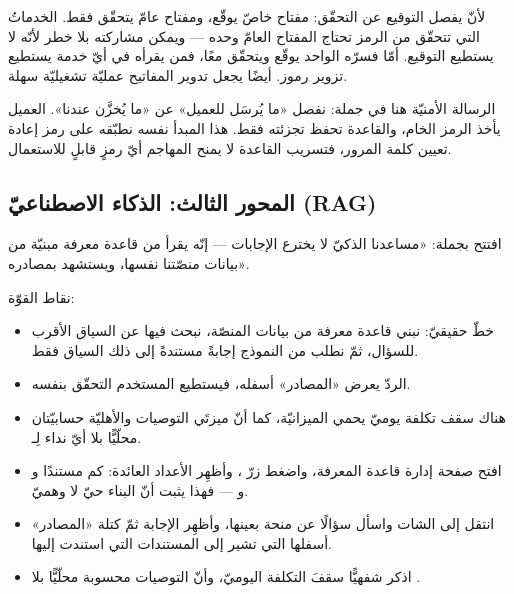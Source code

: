 \begin{qa}
لأنّ  يفصل التوقيع عن التحقّق: مفتاح خاصّ يوقّع، ومفتاح عامّ يتحقّق فقط.
الخدماتُ التي تتحقّق من الرمز تحتاج المفتاح العامّ وحده — ويمكن مشاركته بلا خطر لأنّه
لا يستطيع التوقيع. أمّا  فسرّه الواحد يوقّع ويتحقّق معًا، فمن يقرأه في أيّ
خدمة يستطيع تزوير رموز.  أيضًا يجعل تدوير المفاتيح عمليّة تشغيليّة سهلة.
\end{qa}

\begin{secnote}
الرسالة الأمنيّة هنا في جملة: نفصل «ما يُرسَل للعميل» عن «ما يُخزَّن عندنا». العميل
يأخذ الرمز الخام، والقاعدة تحفظ تجزئته فقط. هذا المبدأ نفسه نطبّقه على رمز إعادة
تعيين كلمة المرور، فتسريب القاعدة لا يمنح المهاجم أيّ رمزٍ قابلٍ للاستعمال.
\end{secnote}

\subsection{المحور الثالث: الذكاء الاصطناعيّ (RAG)}

افتتح بجملة: «مساعدنا الذكيّ لا يخترع الإجابات — إنّه يقرأ من قاعدة معرفة مبنيّة من
بيانات منصّتنا نفسها، ويستشهد بمصادره».

نقاط القوّة:
\begin{itemize}
\item خطّ  حقيقيّ: نبني قاعدة معرفة من بيانات المنصّة، نبحث فيها عن السياق
  الأقرب للسؤال، ثمّ نطلب من النموذج إجابةً مستندةً إلى ذلك السياق فقط.
\item الردّ يعرض «المصادر» أسفله، فيستطيع المستخدم التحقّق بنفسه.
\item هناك سقف تكلفة يوميّ يحمي الميزانيّة، كما أنّ ميزتَي التوصيات والأهليّة
  حسابيّتان محلّيًّا بلا أيّ نداء لِـ.
\end{itemize}

\begin{idea}
\begin{itemize}
\item افتح صفحة إدارة قاعدة المعرفة، واضغط زرّ ، وأظهِر الأعداد العائدة:
  كم مستندًا  و و — فهذا يثبت أنّ البناء
  حيّ لا وهميّ.
\item انتقل إلى الشات واسأل سؤالًا عن منحة بعينها، وأظهِر الإجابة ثمّ كتلة «المصادر»
  أسفلها التي تشير إلى المستندات التي استندت إليها.
\item اذكر شفهيًّا سقفَ التكلفة اليوميّ، وأنّ التوصيات محسوبة محلّيًّا بلا .
\end{itemize}
\end{idea}

